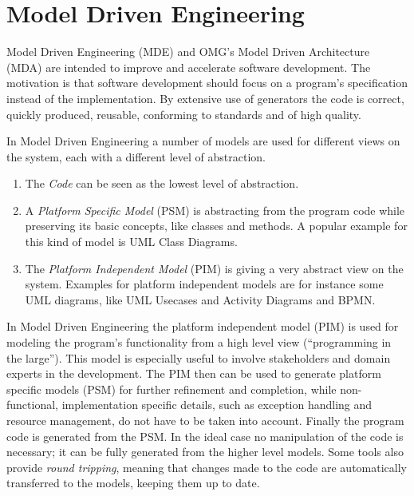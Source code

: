 \chapter{Model Driven Engineering}
\label{chapter:mde}

Model Driven Engineering (MDE) and OMG's Model Driven Architecture (MDA) \cite{mdaguide} are intended to improve and accelerate software development. The motivation is that software development should focus on a program's specification instead of the implementation. By extensive use of generators the code is correct, quickly produced, reusable, conforming to standards and of high quality.

In Model Driven Engineering a number of models are used for different views on the system, each with a different level of abstraction.

\begin{enumerate}
	\item The \emph{Code} can be seen as the lowest level of abstraction.
	\item A \emph{Platform Specific Model} (PSM) is abstracting from the program code while preserving its basic concepts, like classes and methods. A popular example for this kind of model is UML Class Diagrams.
	\item The \emph{Platform Independent Model} (PIM) is giving a very abstract view on the system. Examples for platform independent models are for instance some UML diagrams, like UML Usecases and Activity Diagrams and BPMN.
\end{enumerate}

In Model Driven Engineering the platform independent model (PIM) is used for modeling the program's functionality from a high level view (``programming in the large''). This model is especially useful to involve stakeholders and domain experts in the development. The PIM then can be used to generate platform specific models (PSM) for further refinement and completion, while non-functional, implementation specific details, such as exception handling and resource management, do not have to be taken into account. Finally the program code is generated from the PSM. In the ideal case no manipulation of the code is necessary; it can be fully generated from the higher level models. Some tools also provide \emph{round tripping}, meaning that changes made to the code are automatically transferred to the models, keeping them up to date.

